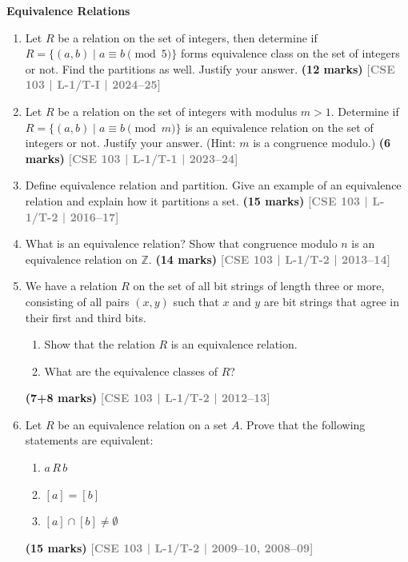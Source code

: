\documentclass[12pt,a3paper]{article}
\newcommand{\yr}[1]{\hfill\textcolor{gray}{\small\textbf{[#1]}}}
\newcommand{\mk}[1]{\textcolor{orange!70!black}{\small\textbf{(#1 marks)}}}
\newcommand{\subtopic}[2]{%
  \vspace{10pt}
  \noindent\begin{tcolorbox}[colback=#1!8,colframe=#1,boxrule=0.6pt,arc=4pt,
    left=6pt,right=6pt,top=4pt,bottom=4pt]
    \small\bfseries\textcolor{#1}{#2}
  \end{tcolorbox}
  \vspace{2pt}
}
\begin{document}
\subtopic{cB}{Equivalence Relations}
\label{sub:s4-equivalence}

\begin{enumerate}

\item Let $R$ be a relation on the set of integers, then determine if $R = \{(a,b) \mid a \equiv b \pmod{5}\}$ forms equivalence class on the set of integers or not. Find the partitions as well. Justify your answer.
\mk{12} \yr{CSE 103 | L-1/T-I | 2024--25}  

\item Let $R$ be a relation on the set of integers with modulus $m > 1$. Determine if $R = \{(a, b) \mid a \equiv b \pmod{m}\}$ is an equivalence relation on the set of integers or not. Justify your answer. (Hint: $m$ is a congruence modulo.)
\mk{6} \yr{CSE 103 | L-1/T-1 | 2023--24}

\item Define equivalence relation and partition. Give an example of an equivalence relation and explain how it partitions a set.
\mk{15} \yr{CSE 103 | L-1/T-2 | 2016--17}

  
\item What is an equivalence relation? Show that congruence modulo $n$ is an equivalence relation on $\mathbb{Z}$.
\mk{14} \yr{CSE 103 | L-1/T-2 | 2013--14}


\item We have a relation $R$ on the set of all bit strings of length three or more, consisting of all pairs $(x, y)$ such that $x$ and $y$ are bit strings that agree in their first and third bits.
\begin{enumerate}
  \item Show that the relation $R$ is an equivalence relation.
  \item What are the equivalence classes of $R$?
\end{enumerate}
\mk{7+8} \yr{CSE 103 | L-1/T-2 | 2012--13}

\item Let $R$ be an equivalence relation on a set $A$. Prove that the following statements are equivalent:
\begin{enumerate}
  \item $a\, R\, b$
  \item $[a] = [b]$
  \item $[a] \cap [b] \neq \emptyset$
\end{enumerate}
\mk{15} \yr{CSE 103 | L-1/T-2 | 2009--10, 2008--09}




\end{enumerate}
\end{document}
